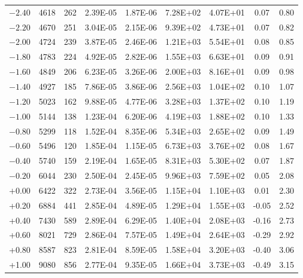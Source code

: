 \documentclass[traditabstract]{aa}
\begin{document}
\begin{table}[htbp]
\begin{tabular}{l c c c c c c c c}
 $-2.40$ &    4618 &    262 &   2.39E-05 &   1.87E-06 &   7.28E+02 &   4.07E+01  &     0.07 &     0.80 \\
 $-2.20$ &    4670 &    251 &   3.04E-05 &   2.15E-06 &   9.39E+02 &   4.73E+01  &     0.07 &     0.82 \\
 $-2.00$ &    4724 &    239 &   3.87E-05 &   2.46E-06 &   1.21E+03 &   5.54E+01  &     0.08 &     0.85 \\
 $-1.80$ &    4783 &    224 &   4.92E-05 &   2.82E-06 &   1.55E+03 &   6.63E+01  &     0.09 &     0.91 \\
 $-1.60$ &    4849 &    206 &   6.23E-05 &   3.26E-06 &   2.00E+03 &   8.16E+01  &     0.09 &     0.98 \\
 $-1.40$ &    4927 &    185 &   7.86E-05 &   3.86E-06 &   2.56E+03 &   1.04E+02  &     0.10 &     1.07 \\
 $-1.20$ &    5023 &    162 &   9.88E-05 &   4.77E-06 &   3.28E+03 &   1.37E+02  &     0.10 &     1.19 \\
 $-1.00$ &    5144 &    138 &   1.23E-04 &   6.20E-06 &   4.19E+03 &   1.88E+02  &     0.10 &     1.33 \\
 $-0.80$ &    5299 &    118 &   1.52E-04 &   8.35E-06 &   5.34E+03 &   2.65E+02  &     0.09 &     1.49 \\
 $-0.60$ &    5496 &    120 &   1.85E-04 &   1.15E-05 &   6.73E+03 &   3.76E+02  &     0.08 &     1.67 \\
 $-0.40$ &    5740 &    159 &   2.19E-04 &   1.65E-05 &   8.31E+03 &   5.30E+02  &     0.07 &     1.87 \\
 $-0.20$ &    6044 &    230 &   2.50E-04 &   2.45E-05 &   9.96E+03 &   7.59E+02  &     0.05 &     2.08 \\
 $+0.00$ &    6422 &    322 &   2.73E-04 &   3.56E-05 &   1.15E+04 &   1.10E+03  &     0.01 &     2.30 \\
   +0.20 &    6884 &    441 &   2.85E-04 &   4.89E-05 &   1.29E+04 &   1.55E+03  &    -0.05 &     2.52 \\
   +0.40 &    7430 &    589 &   2.89E-04 &   6.29E-05 &   1.40E+04 &   2.08E+03  &    -0.16 &     2.73 \\
   +0.60 &    8021 &    729 &   2.86E-04 &   7.57E-05 &   1.49E+04 &   2.64E+03  &    -0.29 &     2.92 \\
   +0.80 &    8587 &    823 &   2.81E-04 &   8.59E-05 &   1.58E+04 &   3.20E+03  &    -0.40 &     3.06 \\
   +1.00 &    9080 &    856 &   2.77E-04 &   9.35E-05 &   1.66E+04 &   3.73E+03  &    -0.49 &     3.15 \\

\end{tabular}
\end{table}
\end{document}
